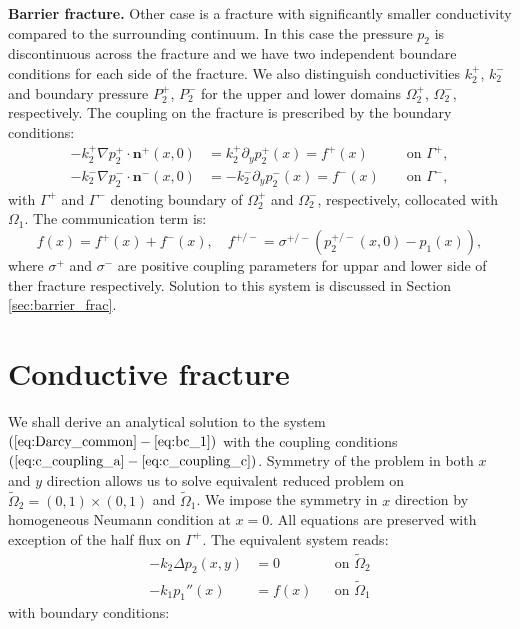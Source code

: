 \documentclass{elsarticle}
\def\Laplace{\Delta}
\def\prtl{\partial} %
\def\grad{\nabla}
\def\vc#1{\mathbf{\boldsymbol{#1}}}     %
\begin{document}
{\bf Barrier fracture.} Other case is a fracture with significantly smaller conductivity compared to the surrounding continuum. In this case
the pressure $p_2$ is discontinuous across the fracture and we have two independent boundare conditions for each side of the fracture. We also 
distinguish conductivities $k_2^+$, $k_2^-$ and boundary pressure $P_2^+$, $P_2^-$ for the upper and lower domains $\Omega_2^+$, $\Omega_2^-$, 
respectively. The coupling on the fracture is prescribed by the boundary conditions:
\begin{align}
  \label{eq:bc_barrier_p}  
  - k_2^+ \grad p_2^+\cdot \vc n^+(x,0) &= k_2^+ \prtl_y p_2^+(x) = f^+(x) 
                    &&\text{ on }\Gamma^{+},\\
  \label{eq:bc_barrier_m}
  - k_2^- \grad p_2^-\cdot \vc n^-(x,0) &= -k_2^- \prtl_y p_2^-(x) = f^-(x) 
                    &&\text{ on }\Gamma^{-},
\end{align}
with $\Gamma^{+}$ and $\Gamma^{-}$ denoting boundary of $\Omega_2^+$ and $\Omega_2^-$, respectively, collocated with $\Omega_1$.
The communication term is:
\begin{equation}
  \label{eq:coupling_barrier}
  f(x) = f^+(x) + f^-(x),\quad f^{+/-} = \sigma^{+/-} (p^{+/-}_2(x,0) - p_1(x)),
\end{equation}
where $\sigma^+$ and $\sigma^-$ are positive coupling parameters for uppar and lower side of ther fracture respectively. 
Solution to this system is discussed in Section \ref{sec:barrier_frac}. 

\section{Conductive fracture }
\label{sec:continuous_frac}
We shall derive an analytical solution to the system $(\ref{eq:Darcy_common} - \ref{eq:bc_1})$ with the coupling conditions 
$(\ref{eq:c_coupling_a} - \ref{eq:c_coupling_c})$. Symmetry of the problem in 
both $x$ and $y$ direction allows us to solve equivalent reduced problem on $\widetilde\Omega_2=(0,1)\times(0,1)$ and  
$\widetilde\Omega_1$. We impose the symmetry in $x$ direction by homogeneous Neumann condition at $x=0$. 
All equations are preserved with exception of the half flux on $\Gamma^+$. The equivalent system  reads:
\begin{align}
    \label{eq:cc_darcy_2d}
    -k_2 \Laplace p_2(x,y) &= 0         &&\text{on }\widetilde\Omega_2 \\
    \label{eq:cc_darcy_1d}
    -k_1 p_1''(x) &= f(x)               &&\text{on }\widetilde\Omega_1
\end{align}
with boundary conditions:    
\end{document}
